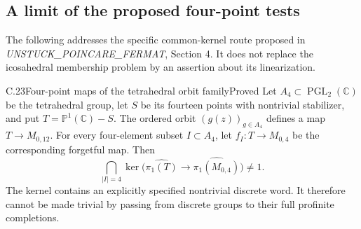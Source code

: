 \subsection{A limit of the proposed four-point tests}

The following addresses the specific common-kernel route proposed in
\emph{UNSTUCK\_\allowbreak POINCARE\_\allowbreak FERMAT}, Section 4. It does not replace the
icosahedral membership problem by an assertion about its linearization.

\begin{statement}{C.23}{Four-point maps of the tetrahedral orbit family}{Proved}
Let $A_4\subset\operatorname{PGL}_2(\mathbb C)$ be the tetrahedral group,
let $S$ be its fourteen points with nontrivial stabilizer, and put
$T=\mathbb P^1(\mathbb C)-S$. The ordered orbit
$(g(z))_{g\in A_4}$ defines a map $T\to M_{0,12}$.
For every four-element subset $I\subset A_4$, let
$f_I:T\to M_{0,4}$ be the corresponding forgetful map. Then
\[
 \bigcap_{|I|=4}\ker\bigl(\widehat{\pi_1(T)}
                   \longrightarrow\widehat{\pi_1(M_{0,4})}\bigr)
 \ne1.
 \tag{C23.1}
\]
The kernel contains an explicitly specified nontrivial discrete word.
It therefore cannot be made trivial by passing from discrete groups to
their full profinite completions.
\end{statement}
